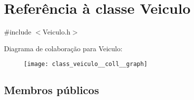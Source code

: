 \hypertarget{class_veiculo}{\section{Referência à classe Veiculo}
\label{class_veiculo}
}


{\ttfamily \#include $<$Veiculo.\+h$>$}



Diagrama de colaboração para Veiculo\+:\nopagebreak
\begin{figure}[H]
\begin{center}
\leavevmode
\texttt{[image: class\_veiculo\_\_coll\_\_graph]}
\end{center}
\end{figure}
\subsection*{Membros públicos}

